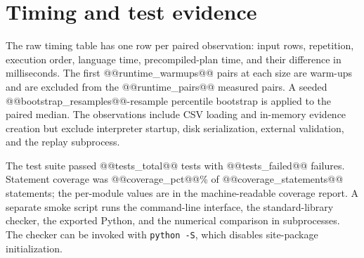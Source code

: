 \documentclass[11pt,letterpaper]{article}
\begin{document}
\section{Timing and test evidence}
The raw timing table has one row per paired observation: input rows, repetition, execution order, language time, precompiled-plan time, and their difference in milliseconds. The first @@runtime_warmups@@ pairs at each size are warm-ups and are excluded from the @@runtime_pairs@@ measured pairs. A seeded @@bootstrap_resamples@@-resample percentile bootstrap is applied to the paired median. The observations include CSV loading and in-memory evidence creation but exclude interpreter startup, disk serialization, external validation, and the replay subprocess.

The test suite passed @@tests_total@@ tests with @@tests_failed@@ failures. Statement coverage was @@coverage_pct@@\% of @@coverage_statements@@ statements; the per-module values are in the machine-readable coverage report. A separate smoke script runs the command-line interface, the standard-library checker, the exported Python, and the numerical comparison in subprocesses. The checker can be invoked with \texttt{python -S}, which disables site-package initialization.
\end{document}
